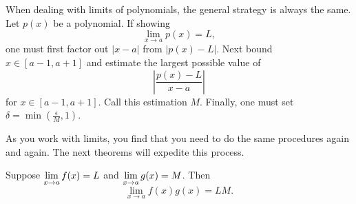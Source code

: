 When dealing with limits of polynomials, the general strategy is
always the same. Let $p(x)$ be a polynomial. If showing
\[
\lim_{x\to a} p(x) = L,
\]
one must first factor out $|x-a|$ from $|p(x) - L|$. Next bound $x\in
[a-1,a+1]$ and estimate the largest possible value of
\[
\left|\frac{p(x) -L}{x-a}\right|
\]
for $x\in[a-1,a+1]$. Call this estimation $M$. Finally, one must set
$\delta = \min\left(\frac{\epsilon}{M}, 1\right)$.

As you work with limits, you find that you need to do the same
procedures again and again. The next theorems will expedite this
process.
\begin{theorem} 
Suppose $\displaystyle \lim_{x\to a} f(x)=L$ and $\displaystyle \lim_{x\to a}g(x)=M$. Then
\[
\lim_{x\to a} f(x)g(x) = LM.
\]
\end{theorem}

